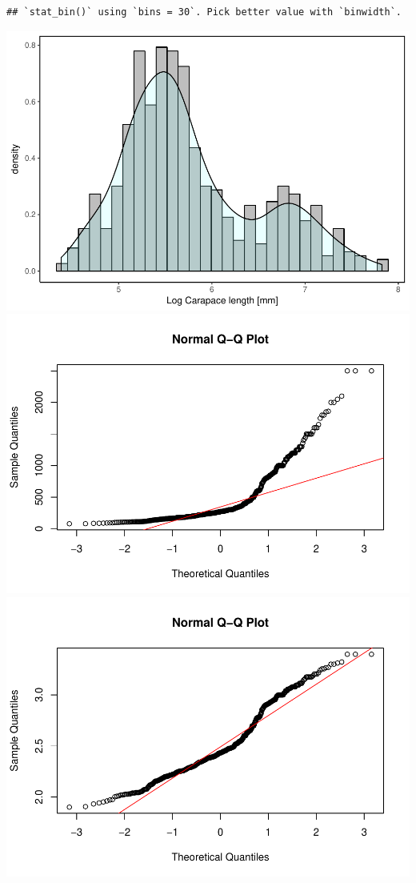 \documentclass[]{article}
\begin{document}
\begin{verbatim}
## `stat_bin()` using `bins = 30`. Pick better value with `binwidth`.
\end{verbatim}

\includegraphics{MA_JJ_files/figure-latex/HistAll-1.pdf}
\includegraphics{MA_JJ_files/figure-latex/normalDistribution-1.pdf}
\includegraphics{MA_JJ_files/figure-latex/normalDistribution-2.pdf}
\end{document}
